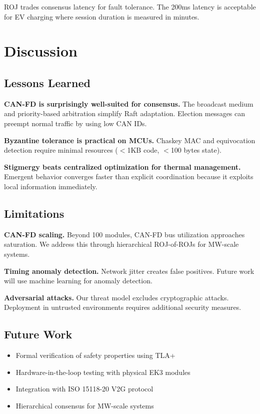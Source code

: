 \documentclass[conference,10pt]{IEEEtran}
\begin{document}
ROJ trades consensus latency for fault tolerance. The 200ms latency is acceptable for EV charging where session duration is measured in minutes.

\section{Discussion}
\label{sec:discussion}

\subsection{Lessons Learned}

\textbf{CAN-FD is surprisingly well-suited for consensus.} The broadcast medium and priority-based arbitration simplify Raft adaptation. Election messages can preempt normal traffic by using low CAN IDs.

\textbf{Byzantine tolerance is practical on MCUs.} Chaskey MAC and equivocation detection require minimal resources ($<$1KB code, $<$100 bytes state).

\textbf{Stigmergy beats centralized optimization for thermal management.} Emergent behavior converges faster than explicit coordination because it exploits local information immediately.

\subsection{Limitations}

\textbf{CAN-FD scaling.} Beyond 100 modules, CAN-FD bus utilization approaches saturation. We address this through hierarchical ROJ-of-ROJs for MW-scale systems.

\textbf{Timing anomaly detection.} Network jitter creates false positives. Future work will use machine learning for anomaly detection.

\textbf{Adversarial attacks.} Our threat model excludes cryptographic attacks. Deployment in untrusted environments requires additional security measures.

\subsection{Future Work}

\begin{itemize}
    \item Formal verification of safety properties using TLA+
    \item Hardware-in-the-loop testing with physical EK3 modules
    \item Integration with ISO 15118-20 V2G protocol
    \item Hierarchical consensus for MW-scale systems
\end{itemize}
\end{document}

